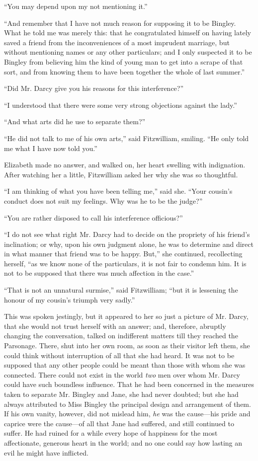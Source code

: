 \documentclass[12pt,openright]{book}
\begin{document}
“You may depend upon my not mentioning it.”

“And remember that I have not much reason for supposing it to be Bingley. What he told me was merely this: that he congratulated himself on having lately saved a friend from the inconveniences of a most imprudent marriage, but without mentioning names or any other particulars; and I only suspected it to be Bingley from believing him the kind of young man to get into a scrape of that sort, and from knowing them to have been together the whole of last summer.”

“Did Mr. Darcy give you his reasons for this interference?”

“I understood that there were some very strong objections against the lady.”

“And what arts did he use to separate them?”

“He did not talk to me of his own arts,” said Fitzwilliam, smiling. “He only told me what I have now told you.”

Elizabeth made no answer, and walked on, her heart swelling with indignation. After watching her a little, Fitzwilliam asked her why she was so thoughtful.

“I am thinking of what you have been telling me,” said she. “Your cousin’s conduct does not suit my feelings. Why was he to be the judge?”

“You are rather disposed to call his interference officious?”

“I do not see what right Mr. Darcy had to decide on the propriety of his friend’s inclination; or why, upon his own judgment alone, he was to determine and direct in what manner that friend was to be happy. But,” she continued, recollecting herself, “as we know none of the particulars, it is not fair to condemn him. It is not to be supposed that there was much affection in the case.”

“That is not an unnatural surmise,” said Fitzwilliam; “but it is lessening the honour of my cousin’s triumph very sadly.”

This was spoken jestingly, but it appeared to her so just a picture of Mr. Darcy, that she would not trust herself with an answer; and, therefore, abruptly changing the conversation, talked on indifferent matters till they reached the Parsonage. There, shut into her own room, as soon as their visitor left them, she could think without interruption of all that she had heard. It was not to be supposed that any other people could be meant than those with whom she was connected. There could not exist in the world \textit{two} men over whom Mr. Darcy could have such boundless influence. That he had been concerned in the measures taken to separate Mr. Bingley and Jane, she had never doubted; but she had always attributed to Miss Bingley the principal design and arrangement of them. If his own vanity, however, did not mislead him, \textit{he} was the cause—his pride and caprice were the cause—of all that Jane had suffered, and still continued to suffer. He had ruined for a while every hope of happiness for the most affectionate, generous heart in the world; and no one could say how lasting an evil he might have inflicted.
\end{document}
